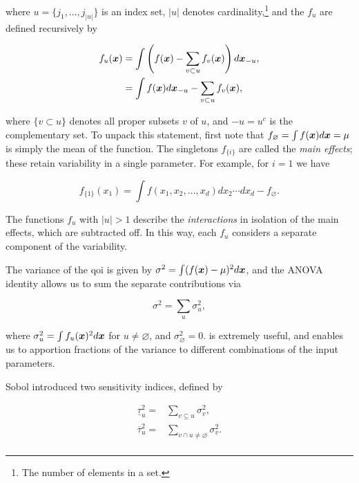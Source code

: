 \documentclass[../primer.tex]{subfiles}
\begin{document}
\noindent where \(u=\{j_1,\dots,j_{|u|}\}\) is an index set, \(|u|\) denotes
cardinality,\footnote{The number of elements in a set.} and the \(f_u\) are defined
recursively by

\begin{equation}\begin{aligned}\label{eq:f-anova-rec}
  f_u(\boldsymbol{x}) &= \int\left(f(\boldsymbol{x})-\sum_{v\subset u} f_v(\boldsymbol{x})\right)d\boldsymbol{x}_{-u}, \\
  &= \int f(\boldsymbol{x})d\boldsymbol{x}_{-u} - \sum_{v\subset u} f_v(\boldsymbol{x}),
\end{aligned}\end{equation}

\noindent where \(\{v\subset u\}\) denotes all proper subsets \(v\) of \(u\), and
\(-u=u^c\) is the complementary set. To unpack this statement, first note that
\(f_{\varnothing}=\int f(\boldsymbol{x})d\boldsymbol{x}=\mu\) is simply the mean of the function. The
singletons \(f_{\{i\}}\) are called the \emph{main effects}; these retain variability
in a single parameter. For example, for \(i=1\) we have

\begin{equation}
  f_{\{1\}}(x_1) = \int f(x_1,x_2,\dots,x_d)dx_2\cdots dx_d - f_{\varnothing}.
\end{equation}

\noindent The functions \(f_u\) with \(|u|>1\) describe the \emph{interactions} in
isolation of the main effects, which are subtracted off. In this way, each \(f_u\)
considers a separate component of the variability.

The variance of the qoi is given by \(\sigma^2=\int(f(\boldsymbol{x})-\mu)^2d\boldsymbol{x}\), and the
ANOVA identity allows us to sum the separate contributions via

\begin{equation}\label{eq:anova-idet}
  \sigma^2 = \sum_u \sigma_u^2,
\end{equation}

\noindent where \(\sigma_u^2 = \int f_u(\boldsymbol{x})^2d\boldsymbol{x}\) for \(u\neq\varnothing\), and
\(\sigma_{\varnothing}^2=0\).  is extremely useful, and
enables us to apportion fractions of the variance to different combinations of
the input parameters.

Sobol \cite{sobol1993} introduced two sensitivity indices, defined by

\begin{equation}\begin{aligned}\label{eq:sobol-indices}
  \underline{\tau}_u^2 = &\sum_{v\subseteq u}\sigma_v^2, \\
  \overline{\tau}_u^2 = &\sum_{v\cap u\neq\varnothing}\sigma_v^2. \\
\end{aligned}\end{equation}
\end{document}
